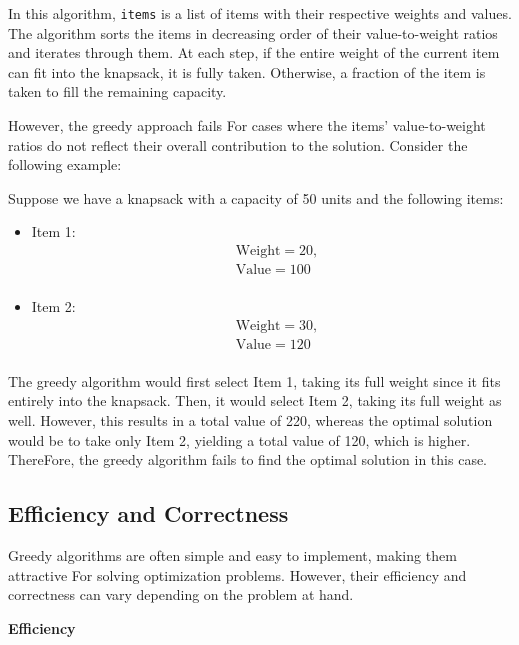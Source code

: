 \documentclass[12pt]{book} %
\begin{document}
In this algorithm, \texttt{items} is a list of items with their respective weights and values. The algorithm sorts the items in decreasing order of their value-to-weight ratios and iterates through them. At each step, if the entire weight of the current item can fit into the knapsack, it is fully taken. Otherwise, a fraction of the item is taken to fill the remaining capacity.

However, the greedy approach fails For cases where the items' value-to-weight ratios do not reflect their overall contribution to the solution. Consider the following example:

Suppose we have a knapsack with a capacity of 50 units and the following items:

\begin{itemize}
    \item Item 1:
    \[
    \begin{aligned}
    & \text{Weight} = 20, \\
    & \text{Value} = 100 \\
    \end{aligned}
    \]

    \item Item 2:
    \[
    \begin{aligned}
    & \text{Weight} = 30, \\
    & \text{Value} = 120 \\
    \end{aligned}
    \]
\end{itemize}

The greedy algorithm would first select Item 1, taking its full weight since it fits entirely into the knapsack. Then, it would select Item 2, taking its full weight as well. However, this results in a total value of 220, whereas the optimal solution would be to take only Item 2, yielding a total value of 120, which is higher. ThereFore, the greedy algorithm fails to find the optimal solution in this case.

\subsection{Efficiency and Correctness}

Greedy algorithms are often simple and easy to implement, making them attractive For solving optimization problems. However, their efficiency and correctness can vary depending on the problem at hand.

\textbf{Efficiency}
\end{document}
